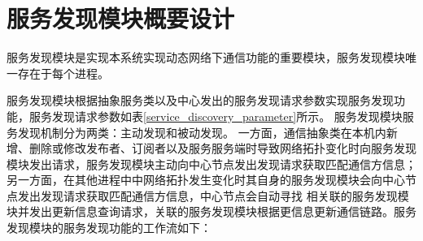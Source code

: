 \section{服务发现模块概要设计}
服务发现模块是实现本系统实现动态网络下通信功能的重要模块，服务发现模块唯一存在于每个进程。

服务发现模块根据抽象服务类以及中心发出的服务发现请求参数实现服务发现功能，服务发现请求参数如表\ref{service_discovery_parameter}所示。
服务发现模块服务发现机制分为两类：主动发现和被动发现。
一方面，通信抽象类在本机内新增、删除或修改发布者、订阅者以及服务服务端时导致网络拓扑变化时向服务发现模块发出请求，服务发现模块主动向中心节点发出发现请求获取匹配通信方信息；
另一方面，在其他进程中中网络拓扑发生变化时其自身的服务发现模块会向中心节点发出发现请求获取匹配通信方信息，中心节点会自动寻找
相关联的服务发现模块并发出更新信息查询请求，关联的服务发现模块根据更信息更新通信链路。服务发现模块的服务发现功能的工作流如下：
